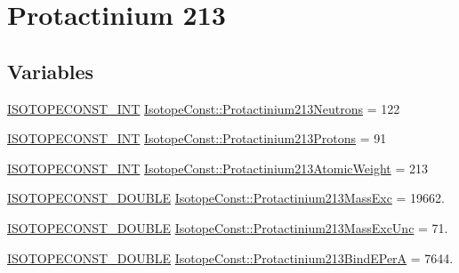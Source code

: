 \hypertarget{group___isotope_const-_protactinium-_pa213}{}\section{Protactinium 213}
\label{group___isotope_const-_protactinium-_pa213}
\subsection*{Variables}
\begin{DoxyCompactItemize}
\item 
\mbox{\hyperlink{group___isotope_const-_macros_ga5f18360b3e99483a35c32d789e62621c}{I\+S\+O\+T\+O\+P\+E\+C\+O\+N\+S\+T\+\_\+\+I\+NT}} \mbox{\hyperlink{group___isotope_const-_protactinium-_pa213_gad852166ffcaa6ca6852be83d9100368a}{Isotope\+Const\+::\+Protactinium213\+Neutrons}} = 122
\item 
\mbox{\hyperlink{group___isotope_const-_macros_ga5f18360b3e99483a35c32d789e62621c}{I\+S\+O\+T\+O\+P\+E\+C\+O\+N\+S\+T\+\_\+\+I\+NT}} \mbox{\hyperlink{group___isotope_const-_protactinium-_pa213_gac7b41e4bb65e677a3f9e1b705931871b}{Isotope\+Const\+::\+Protactinium213\+Protons}} = 91
\item 
\mbox{\hyperlink{group___isotope_const-_macros_ga5f18360b3e99483a35c32d789e62621c}{I\+S\+O\+T\+O\+P\+E\+C\+O\+N\+S\+T\+\_\+\+I\+NT}} \mbox{\hyperlink{group___isotope_const-_protactinium-_pa213_gaf2e1ad0622ace9732e59dfe18f2bc97c}{Isotope\+Const\+::\+Protactinium213\+Atomic\+Weight}} = 213
\item 
\mbox{\hyperlink{group___isotope_const-_macros_ga8f45a7272ce02c0b4c65c44636ed719a}{I\+S\+O\+T\+O\+P\+E\+C\+O\+N\+S\+T\+\_\+\+D\+O\+U\+B\+LE}} \mbox{\hyperlink{group___isotope_const-_protactinium-_pa213_gad6ee86cf75d0ab6ae6933a5c6726de4b}{Isotope\+Const\+::\+Protactinium213\+Mass\+Exc}} = 19662.
\item 
\mbox{\hyperlink{group___isotope_const-_macros_ga8f45a7272ce02c0b4c65c44636ed719a}{I\+S\+O\+T\+O\+P\+E\+C\+O\+N\+S\+T\+\_\+\+D\+O\+U\+B\+LE}} \mbox{\hyperlink{group___isotope_const-_protactinium-_pa213_ga1a58876e5ddc3090c878efacd49cbb6a}{Isotope\+Const\+::\+Protactinium213\+Mass\+Exc\+Unc}} = 71.
\item 
\mbox{\hyperlink{group___isotope_const-_macros_ga8f45a7272ce02c0b4c65c44636ed719a}{I\+S\+O\+T\+O\+P\+E\+C\+O\+N\+S\+T\+\_\+\+D\+O\+U\+B\+LE}} \mbox{\hyperlink{group___isotope_const-_protactinium-_pa213_ga4af4a814a17fc9c483a5e10333149853}{Isotope\+Const\+::\+Protactinium213\+Bind\+E\+PerA}} = 7644.

\end{DoxyCompactItemize}
